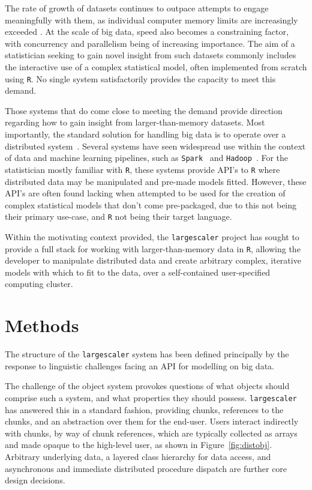 The rate of growth of datasets continues to outpace attempts to engage meaningfully with them, as individual computer memory limits are increasingly exceeded \cite{kleppmann2017dataintensive}.
At the scale of big data, speed also becomes a constraining factor, with concurrency and parallelism being of increasing importance.
The aim of a statistician seeking to gain novel insight from such datasets commonly includes the interactive use of a complex statistical model, often implemented from scratch using \texttt{R}.
No single system satisfactorily provides the capacity to meet this demand.

Those systems that do come close to meeting the demand provide direction regarding how to gain insight from larger-than-memory datasets.
Most importantly, the standard solution for handling big data is to operate over a distributed system~\cite{boja2012distributed}.
Several systems have seen widespread use within the context of data and machine learning pipelines, such as \texttt{Spark}~\cite{zaharia2016apache} and \texttt{Hadoop}~\cite{shvachko2010hadoop}.
For the statistician mostly familiar with \texttt{R}, these systems provide API's to \texttt{R} where distributed data may be manipulated and pre-made models fitted.
However, these API's are often found lacking when attempted to be used for the creation of complex statistical models that don't come pre-packaged, due to this not being their primary use-case, and \texttt{R} not being their target language.

Within the motivating context provided, the \texttt{largescaler} project has sought to provide a full stack for working with larger-than-memory data in \texttt{R}, allowing the developer to manipulate distributed data and create arbitrary complex, iterative models with which to fit to the data, over a self-contained user-specified computing cluster.

\section{Methods}

The structure of the \texttt{largescaler} system has been defined principally by the response to linguistic challenges facing an API for modelling on big data.

The challenge of the object system provokes questions of what objects should comprise such a system, and what properties they should possess.
\texttt{largescaler} has answered this in a standard fashion, providing chunks, references to the chunks, and an abstraction over them for the end-user. Users interact indirectly with chunks, by way of chunk references, which are typically collected as arrays and made opaque to the high-level user, as shown in Figure~\ref{fig:distobj}. Arbitrary underlying data, a layered class hierarchy for data access, and asynchronous and immediate distributed procedure dispatch are further core design decisions.

